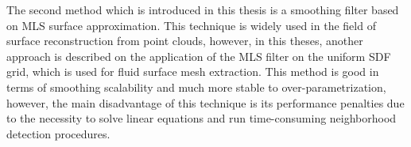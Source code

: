The second method which is introduced in this thesis is a smoothing filter based on MLS surface approximation. This technique is widely used in the field of surface reconstruction from point clouds, however, in this theses, another approach is described on the application of the MLS filter on the uniform SDF grid, which is used for fluid surface mesh extraction. This method is good in terms of smoothing scalability and much more stable to over-parametrization, however, the main disadvantage of this technique is its performance penalties due to the necessity to solve linear equations and run time-consuming neighborhood detection procedures.